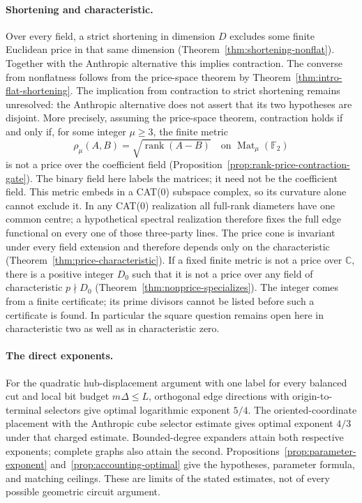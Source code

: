 \documentclass[11pt,a4paper]{article}
\newcommand{\C}{\mathbb C}
\theoremstyle{definition}
\theoremstyle{remark}
\begin{document}
\paragraph{Shortening and characteristic.}
Over every field, a strict shortening in dimension $D$ excludes
some finite Euclidean price in that same dimension
(Theorem~\ref{thm:shortening-nonflat}).
Together with the Anthropic alternative this implies
contraction. The converse from nonflatness follows from the
price-space theorem by Theorem~\ref{thm:intro-flat-shortening}.
The implication from contraction to strict shortening remains
unresolved: the Anthropic alternative does not assert that
its two hypotheses are disjoint.
More precisely, assuming the price-space theorem, contraction
holds if and only if, for some integer $\mu\geq3$, the finite metric
\[
 \rho_\mu(A,B)=\sqrt{\operatorname{rank}(A-B)}
 \quad\text{on }\operatorname{Mat}_\mu(\mathbb F_2)
\]
is not a price over the coefficient field
(Proposition~\ref{prop:rank-price-contraction-gate}).
The binary field here labels the matrices; it need not be the
coefficient field. This metric embeds in a CAT(0) subspace complex,
so its curvature alone cannot exclude it. In any CAT(0) realization
all full-rank diameters have one common centre; a hypothetical
spectral realization therefore fixes the full edge functional on
every one of those three-party lines.
The price cone is invariant under every field extension and
therefore depends only on the characteristic
(Theorem~\ref{thm:price-characteristic}).
If a fixed finite metric is not a price over $\C$, there is a
positive integer $D_0$ such that it is not a price over any
field of characteristic $p\nmid D_0$
(Theorem~\ref{thm:nonprice-specializes}).
The integer comes from a finite certificate; its prime divisors
cannot be listed before such a certificate is found.
In particular the square question remains open here in
characteristic two as well as in characteristic zero.

\paragraph{The direct exponents.}
For the quadratic hub-displacement argument with one label
for every balanced cut and local bit budget $m\Delta\leq L$,
orthogonal edge directions with origin-to-terminal selectors
give optimal logarithmic exponent $5/4$.
The oriented-coordinate placement with the Anthropic cube
selector estimate gives optimal exponent $4/3$ under that
charged estimate. Bounded-degree expanders attain both
respective exponents; complete graphs also attain the second.
Propositions~\ref{prop:parameter-exponent}
and~\ref{prop:accounting-optimal} give the hypotheses,
parameter formula, and matching ceilings.
These are limits of the stated estimates, not of every
possible geometric circuit argument.
\end{document}
